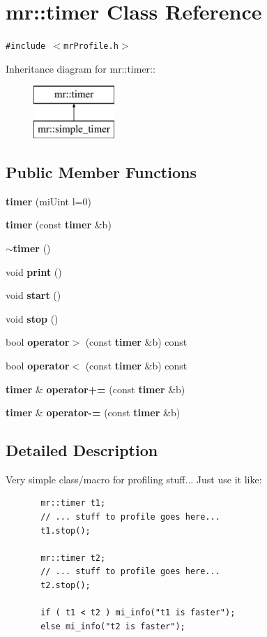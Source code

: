 \section{mr::timer Class Reference}
\label{classmr_1_1timer}
{\tt \#include $<$mr\-Profile.h$>$}

Inheritance diagram for mr::timer::\begin{figure}[H]
\begin{center}
\leavevmode
\includegraphics[height=2cm]{classmr_1_1timer}
\end{center}
\end{figure}
\subsection*{Public Member Functions}
\begin{CompactItemize}
\item 
{\bf timer} (mi\-Uint l=0)
\item 
{\bf timer} (const {\bf timer} \&b)
\item 
{\bf $\sim$timer} ()
\item 
void {\bf print} ()
\item 
void {\bf start} ()
\item 
void {\bf stop} ()
\item 
bool {\bf operator$>$} (const {\bf timer} \&b) const 
\item 
bool {\bf operator$<$} (const {\bf timer} \&b) const 
\item 
{\bf timer} \& {\bf operator+=} (const {\bf timer} \&b)
\item 
{\bf timer} \& {\bf operator-=} (const {\bf timer} \&b)
\end{CompactItemize}


\subsection{Detailed Description}
Very simple class/macro for profiling stuff... Just use it like:



\footnotesize\begin{verbatim}       mr::timer t1;
       // ... stuff to profile goes here...
       t1.stop();
   
       mr::timer t2;
       // ... stuff to profile goes here...
       t2.stop();
   
       if ( t1 < t2 ) mi_info("t1 is faster");
       else mi_info("t2 is faster");
\end{verbatim}
\normalsize




